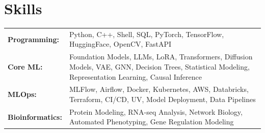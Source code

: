 \documentclass[10pt,a4paper]{article}
\begin{document}

\section*{Skills \hrulefill}
\begin{tabularx}{\textwidth}{lX}
  \textbf{Programming:} & Python, C++, Shell, SQL, PyTorch, TensorFlow, HuggingFace, OpenCV, FastAPI \\
  \textbf{Core ML:} & Foundation Models, LLMs, LoRA, Transformers, Diffusion Models, VAE, GNN, Decision Trees, Statistical Modeling, Representation Learning, Causal Inference \\
  \textbf{MLOps:} & MLFlow, Airflow, Docker, Kubernetes, AWS, Databricks, Terraform, CI/CD, UV, Model Deployment, Data Pipelines \\
  \textbf{Bioinformatics:} & Protein Modeling, RNA-seq Analysis, Network Biology, Automated Phenotyping, Gene Regulation Modeling \\
\end{tabularx}


\end{document}
